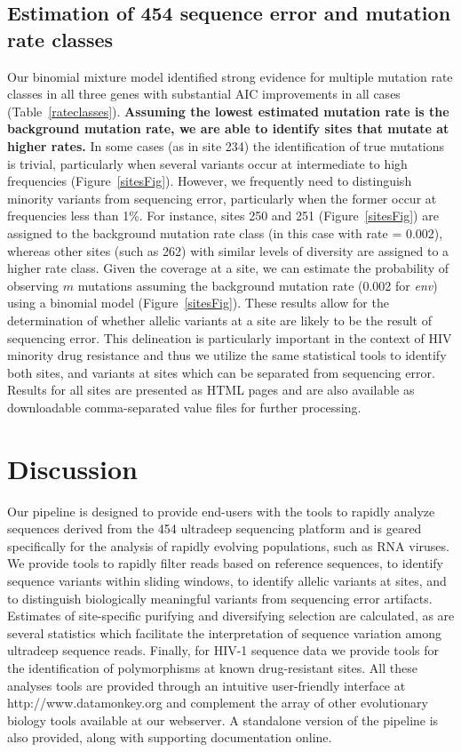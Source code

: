 \documentclass[10pt]{article}
\begin{document}
\subsection*{Estimation of 454 sequence error and mutation rate classes}
Our binomial mixture model identified strong evidence for multiple mutation rate classes
in all three genes with substantial AIC improvements in all cases (Table~\ref{rateclasses}).
\textbf{Assuming the lowest estimated mutation rate is the background mutation rate,
we are able to identify sites that mutate at higher rates.}
In some cases (as in site 234) the identification of true mutations is trivial,
particularly when several variants occur at intermediate to high frequencies (Figure~\ref{sitesFig}).
However, we frequently need to distinguish minority variants from sequencing error,
particularly when the former occur at frequencies less than 1\%.
For instance, sites 250 and 251 (Figure~\ref{sitesFig}) are assigned to the background mutation rate class (in this case with rate = 0.002),
whereas other sites (such as 262) with similar levels of diversity are assigned to a higher rate class.
Given the coverage at a site, we can estimate the probability of observing $m$ mutations assuming the background mutation rate (0.002 for \emph{env})
using a binomial model (Figure~\ref{sitesFig}).
These results allow for the determination of whether allelic variants at a site
are likely to be the result of sequencing error.
This delineation is particularly important in the context of HIV minority drug resistance
and thus we utilize the same statistical tools to identify both sites,
and variants at sites which can be separated from sequencing error.
Results for all sites are presented as HTML pages
and are also available as downloadable comma-separated value files for further processing.

\section*{Discussion}
Our pipeline is designed to provide end-users with the tools to rapidly analyze sequences derived
from the 454 ultradeep sequencing platform and is geared specifically for the analysis of rapidly evolving populations, such as RNA viruses.
We provide tools to rapidly filter reads based on reference sequences,
to identify sequence variants within sliding windows,
to identify allelic variants at sites,
and to distinguish biologically meaningful variants from sequencing error artifacts.
Estimates of site-specific purifying and diversifying selection are calculated,
as are several statistics which facilitate the interpretation of sequence variation among ultradeep sequence reads.
Finally, for HIV-1 sequence data we provide tools for the identification of polymorphisms at known drug-resistant sites.
All these analyses tools are provided through an intuitive user-friendly interface at http://www.datamonkey.org
and complement the array of other evolutionary biology tools available at our webserver.
A standalone version of the pipeline is also provided, along with supporting documentation online.
\end{document}
